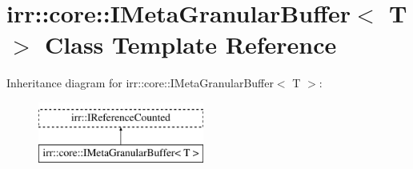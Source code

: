 \hypertarget{classirr_1_1core_1_1IMetaGranularBuffer}{}\section{irr\+:\+:core\+:\+:I\+Meta\+Granular\+Buffer$<$ T $>$ Class Template Reference}
\label{classirr_1_1core_1_1IMetaGranularBuffer}
Inheritance diagram for irr\+:\+:core\+:\+:I\+Meta\+Granular\+Buffer$<$ T $>$\+:\begin{figure}[H]
\begin{center}
\leavevmode
\includegraphics[height=2.000000cm]{classirr_1_1core_1_1IMetaGranularBuffer}
\end{center}
\end{figure}
